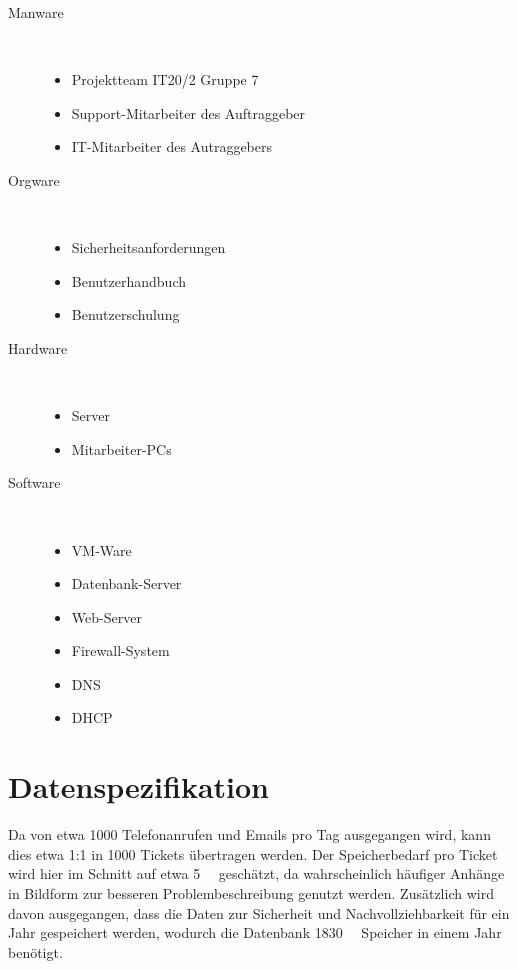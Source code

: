 \documentclass[a4paper,12pt,headings=small,ngerman,bibliography=totoc]{scrartcl}
\begin{document}
\begin{description}
  \item[Manware] \
    \begin{itemize}
      \item Projektteam IT20/2 Gruppe 7
      \item Support-Mitarbeiter des Auftraggeber
      \item IT-Mitarbeiter des Autraggebers
    \end{itemize}
  \item[Orgware] \
    \begin{itemize}
      \item Sicherheitsanforderungen
      \item Benutzerhandbuch
      \item Benutzerschulung
    \end{itemize}
  \item[Hardware] \
    \begin{itemize}
      \item Server
      \item Mitarbeiter-PCs
    \end{itemize}
  \item[Software] \
    \begin{itemize}
      \item VM-Ware
      \item Datenbank-Server
      \item Web-Server
      \item Firewall-System
      \item DNS
      \item DHCP
    \end{itemize}
\end{description}


\section{Datenspezifikation}

Da von etwa 1000 Telefonanrufen  und Emails pro Tag ausgegangen wird, kann dies etwa 1:1 in 1000 Tickets übertragen werden. Der Speicherbedarf pro Ticket wird hier im Schnitt auf etwa \SI{5}{\mega\byte} geschätzt, da wahrscheinlich häufiger Anhänge in Bildform zur besseren Problembeschreibung genutzt werden. Zusätzlich wird davon ausgegangen, dass die Daten zur Sicherheit und Nachvollziehbarkeit für ein Jahr gespeichert werden, wodurch die Datenbank \SI{1830}{\giga\byte} Speicher in einem Jahr benötigt.
\end{document}
